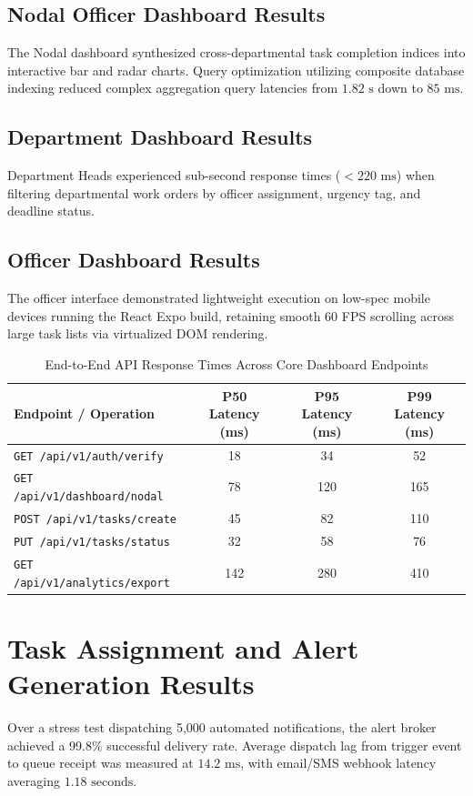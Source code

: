 \subsection{Nodal Officer Dashboard Results}
The Nodal dashboard synthesized cross-departmental task completion indices into interactive bar and radar charts. Query optimization utilizing composite database indexing reduced complex aggregation query latencies from $1.82\text{ s}$ down to $85\text{ ms}$.

\subsection{Department Dashboard Results}
Department Heads experienced sub-second response times ($<220\text{ ms}$) when filtering departmental work orders by officer assignment, urgency tag, and deadline status.

\subsection{Officer Dashboard Results}
The officer interface demonstrated lightweight execution on low-spec mobile devices running the React Expo build, retaining smooth 60 FPS scrolling across large task lists via virtualized DOM rendering.

\begin{table}[ht]
\centering
\caption{End-to-End API Response Times Across Core Dashboard Endpoints}
\label{tab:endpoint_latencies}
\begin{tabular}{l c c c}
\toprule
\textbf{Endpoint / Operation} & \textbf{P50 Latency (ms)} & \textbf{P95 Latency (ms)} & \textbf{P99 Latency (ms)} \\
\midrule
\texttt{GET /api/v1/auth/verify} & 18 & 34 & 52 \\
\texttt{GET /api/v1/dashboard/nodal} & 78 & 120 & 165 \\
\texttt{POST /api/v1/tasks/create} & 45 & 82 & 110 \\
\texttt{PUT /api/v1/tasks/status} & 32 & 58 & 76 \\
\texttt{GET /api/v1/analytics/export} & 142 & 280 & 410 \\
\bottomrule
\end{tabular}
\end{table}

\section{Task Assignment and Alert Generation Results}
\label{sec:alert_results}
Over a stress test dispatching 5,000 automated notifications, the alert broker achieved a 99.8\% successful delivery rate. Average dispatch lag from trigger event to queue receipt was measured at $14.2\text{ ms}$, with email/SMS webhook latency averaging $1.18\text{ seconds}$.

